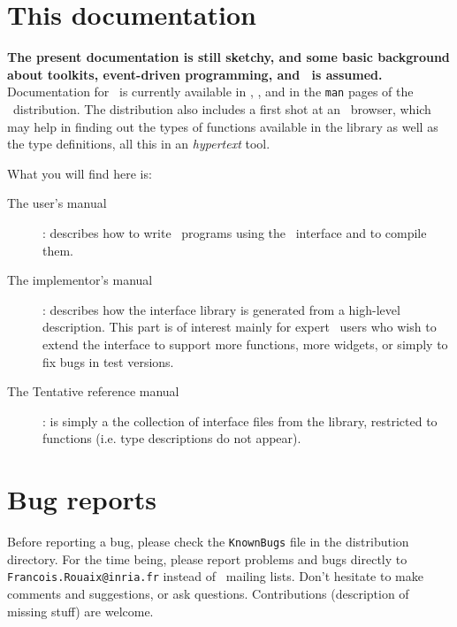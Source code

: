 \section*{This documentation}
{\bf The present documentation is still sketchy, and some basic background
about toolkits, event-driven programming, and \tk\ is assumed.}
Documentation for \tk\ is currently available in \cite{ouster94},
\cite{welch94}, and in the {\tt man} pages of the \tk\ distribution.
The distribution also includes a first shot at an \caml\ browser, which may
help in finding out the types of functions available in the library as well as
the type definitions, all this in an {\em hypertext} tool.


What you will find here is:
\begin{description}
\item[The user's manual] : describes how to write \caml\ programs using the
\tk\ interface and to compile them. 
\item[The implementor's manual] : describes how the interface library is
generated from a high-level description. This part is of interest mainly for
expert \tk\ users who wish to extend the interface to support more
functions, more widgets, or simply to fix bugs in test versions.
\item[The Tentative reference manual] : is simply a the collection of
interface files from the library, restricted to functions (i.e. type
descriptions do not appear). 
\end{description}

\section*{Bug reports}
Before reporting a bug, please check the \verb|KnownBugs| file in the
distribution directory.
For the time being, please report problems and bugs directly to
\verb|Francois.Rouaix@inria.fr| instead of \caml\ mailing lists.
Don't hesitate to make comments and suggestions, or ask questions.
Contributions (description of missing stuff) are welcome.

\tableofcontents





\appendix




